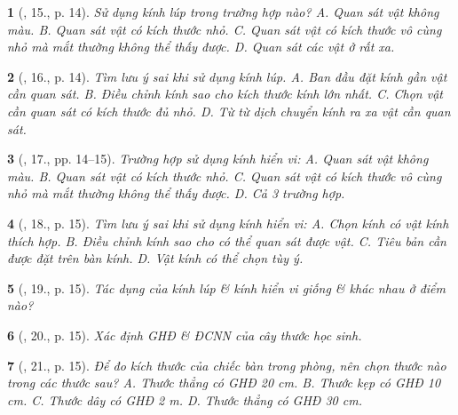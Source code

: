 \documentclass{article}
\newtheorem{baitoan}{}
\begin{document}
\begin{baitoan}[\cite{ncpt_KHTN_6_tap_1}, 15., p. 14]
	Sử dụng kính lúp trong trường hợp nào? {\sf A.} Quan sát vật không màu. {\sf B.} Quan sát vật có kích thước nhỏ. {\sf C.} Quan sát vật có kích thước vô cùng nhỏ mà mắt thường không thể thấy được. {\sf D.} Quan sát các vật ở rất xa.
\end{baitoan}

\begin{baitoan}[\cite{ncpt_KHTN_6_tap_1}, 16., p. 14]
	Tìm lưu ý sai khi sử dụng kính lúp. {\sf A.} Ban đầu đặt kính gần vật cần quan sát. {\sf B.} Điều chỉnh kính sao cho kích thước kính lớn nhất. {\sf C.} Chọn vật cần quan sát có kích thước đủ nhỏ. {\sf D.} Từ từ dịch chuyển kính ra xa vật cần quan sát.
\end{baitoan}

\begin{baitoan}[\cite{ncpt_KHTN_6_tap_1}, 17., pp. 14--15]
	Trường hợp sử dụng kính hiển vi: {\sf A.} Quan sát vật không màu. {\sf B.} Quan sát vật có kích thước nhỏ. {\sf C.} Quan sát vật có kích thước vô cùng nhỏ mà mắt thường không thể thấy được. {\sf D.} Cả 3 trường hợp.
\end{baitoan}

\begin{baitoan}[\cite{ncpt_KHTN_6_tap_1}, 18., p. 15]
	Tìm lưu ý sai khi sử dụng kính hiển vi: {\sf A.} Chọn kính có vật kính thích hợp. {\sf B.} Điều chỉnh kính sao cho có thể quan sát được vật. {\sf C.} Tiêu bản cần được đặt trên bàn kính. {\sf D.} Vật kính có thể chọn tùy ý.
\end{baitoan}

\begin{baitoan}[\cite{ncpt_KHTN_6_tap_1}, 19., p. 15]
	Tác dụng của kính lúp \& kính hiển vi giống \& khác nhau ở điểm nào?
\end{baitoan}

\begin{baitoan}[\cite{ncpt_KHTN_6_tap_1}, 20., p. 15]
	Xác định {\rm GHĐ} \& {\rm ĐCNN} của cây thước học sinh.
\end{baitoan}

\begin{baitoan}[\cite{ncpt_KHTN_6_tap_1}, 21., p. 15]
	Để đo kích thước của chiếc bàn trong phòng, nên chọn thước nào trong các thước sau? {\sf A.} Thước thẳng có {\rm GHĐ 20 cm}. {\sf B.} Thước kẹp có {\rm GHĐ 10 cm}. {\sf C.} Thước dây có {\rm GHĐ 2 m}. {\sf D.} Thước thẳng có {\rm GHĐ 30 cm}.
\end{baitoan}
\end{document}
